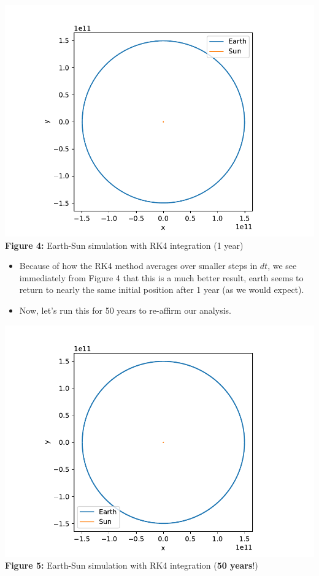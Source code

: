 \documentclass[11pt]{article}
\begin{document}
    \begin{center}
        \includegraphics[scale = 0.8]{images/rk4_earth_sun}
        \\ \caption{\textbf{Figure 4:} Earth-Sun simulation with RK4 integration (1 year)}
        \label{fig:fig4}
    \end{center}

    \begin{itemize}
        \item Because of how the RK4 method averages over smaller steps in $dt$, we see immediately from Figure 4 that this is a much better result, earth seems to return to nearly the same initial position after 1 year (as we would expect).
        \item Now, let's run this for 50 years to re-affirm our analysis.
    \end{itemize}

    \begin{center}
        \includegraphics[scale = 0.8]{images/rk4_earth_sun_50_years}
        \\ \caption{\textbf{Figure 5:} Earth-Sun simulation with RK4 integration (\textbf{50 years}!)}
        \label{fig:fig5}
    \end{center}
\end{document}
